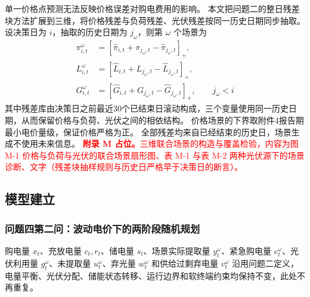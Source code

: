 单一价格点预测无法反映价格误差对购电费用的影响。
本文把问题二的整日残差块方法扩展到三维，将价格残差与负荷残差、光伏残差按同一历史日期同步抽取。
设决策日为 \(i\)，抽取的历史日期为 \(j_{\omega}\)，则第 \(\omega\) 个场景为
\begin{equation}
\begin{aligned}
\pi_{i,t}^{\omega}
&=
\left[
\widehat\pi_{i,t}
+
\pi_{j_{\omega},t}-\widehat\pi_{j_{\omega},t}
\right]_{+},\\
L_{i,t}^{\omega}
&=
\left[
\widehat L_{i,t}
+
L_{j_{\omega},t}-\widehat L_{j_{\omega},t}
\right]_{+},\\
G_{i,t}^{\omega}
&=
\left[
\widehat G_{i,t}
+
G_{j_{\omega},t}-\widehat G_{j_{\omega},t}
\right]_{+},
\qquad
j_{\omega}<i
\end{aligned}
\label{eq:q4_joint_scenario}
\end{equation}
其中残差库由决策日之前最近30个已结束日滚动构成，三个变量使用同一历史日期，从而保留价格与负荷、光伏之间的相依结构。
价格场景的下界取附件4报告期最小电价量级，保证价格严格为正。
全部残差均来自已经结束的历史日，场景生成不使用未来信息。
\textcolor{red}{\textbf{附录 M 占位。}三维联合场景的构造与覆盖检验，内容为图 M-1 价格与负荷与光伏的联合场景扇形图、表 M-1 与表 M-2 两种光伏源下的场景诊断、文字（残差块抽样规则与历史日严格早于决策日的断言）。}

\subsection{模型建立}

\subsubsection{问题四第二问：波动电价下的两阶段随机规划}

购电量 \(x_t\)、充放电量 \(c_t,r_t\)、储电量 \(s_t\)、场景实际提取量 \(y_t^{\omega}\)、紧急购电量 \(e_t^{\omega}\)、光伏利用量 \(g_t^{\omega}\)、未提取量 \(u_t^{\omega}\)、弃光量 \(w_t^{\omega}\) 和供给过剩弃电量 \(v_t^{\omega}\) 沿用问题二定义，电量平衡、光伏分配、储能状态转移、运行边界和软终端约束均保持不变，此处不再重复。

